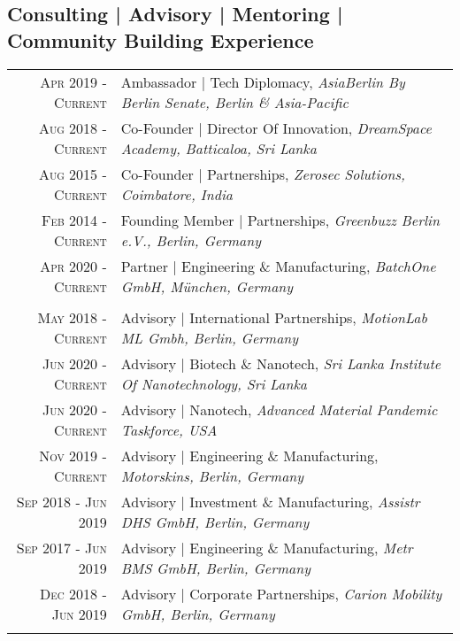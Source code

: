 \subsection{Consulting | Advisory | Mentoring | Community Building Experience}
\begin{longtable}
	{r|p{13cm}}
	\textsc{Apr 2019 - Current} & Ambassador | Tech Diplomacy, \emph{AsiaBerlin By Berlin Senate, Berlin \& Asia-Pacific}\\
	\textsc{Aug 2018 - Current} & Co-Founder | Director Of Innovation, \emph{DreamSpace Academy, Batticaloa, Sri Lanka}\\
	\textsc{Aug 2015 - Current} & Co-Founder | Partnerships, \emph{Zerosec Solutions, Coimbatore, India}\\
	\textsc{Feb 2014 - Current} & Founding Member | Partnerships, \emph{Greenbuzz Berlin e.V., Berlin, Germany}\\
	\textsc{Apr 2020 - Current} & Partner | Engineering \& Manufacturing, \emph{BatchOne GmbH, München, Germany}\\

	\multicolumn{2}{c}{} \\

	\textsc{May 2018 - Current} & Advisory | International Partnerships, \emph{MotionLab ML Gmbh, Berlin, Germany}\\
	\textsc{Jun 2020 - Current} & Advisory | Biotech \& Nanotech, \emph{Sri Lanka Institute Of Nanotechnology, Sri Lanka}\\
	\textsc{Jun 2020 - Current} & Advisory | Nanotech, \emph{Advanced Material Pandemic Taskforce, USA}\\
	\textsc{Nov 2019 - Current} & Advisory | Engineering \& Manufacturing, \emph{Motorskins, Berlin, Germany}\\
	\textsc{Sep 2018 - Jun 2019} & Advisory | Investment \& Manufacturing, \emph{Assistr DHS GmbH, Berlin, Germany}\\
	\textsc{Sep 2017 - Jun 2019} & Advisory | Engineering \& Manufacturing, \emph{Metr BMS GmbH, Berlin, Germany}\\
	\textsc{Dec 2018 - Jun 2019} & Advisory | Corporate Partnerships, \emph{Carion Mobility GmbH, Berlin, Germany}\\

	\multicolumn{2}{c}{} \\


\end{longtable}
